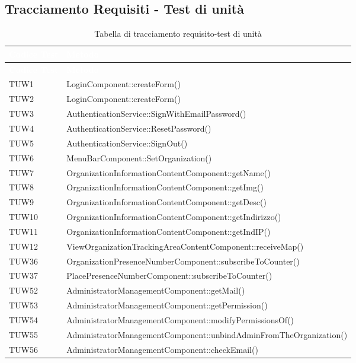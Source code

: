 \subsection{Tracciamento Requisiti - Test di unità}
{
\renewcommand{\arraystretch}{1.5}
\centering
\begin{longtable}{C{2cm} C{8cm}}
\caption{Tabella di tracciamento requisito-test di unità}\\
\textcolor{white}{\textbf{Codice Test}} & \textcolor{white}{\textbf{Metodo}}\\	
\endfirsthead
{}
\textcolor{white}{\textbf{Codice Test}} & \textcolor{white}{\textbf{Metodo}}\\	
\endhead

TUW1 & LoginComponent::createForm() \\
TUW2 & LoginComponent::createForm() \\
TUW3 & AuthenticationService::SignWithEmailPassword() \\
TUW4 & AuthenticationService::ResetPassword() \\
TUW5 & AuthenticationService::SignOut() \\
TUW6 & MenuBarComponent::SetOrganization() \\
TUW7 & OrganizationInformationContentComponent::getName() \\
TUW8 & OrganizationInformationContentComponent::getImg() \\
TUW9 & OrganizationInformationContentComponent::getDesc() \\
TUW10 & OrganizationInformationContentComponent::getIndirizzo() \\
TUW11 & OrganizationInformationContentComponent::getIndIP() \\
TUW12 & ViewOrganizationTrackingAreaContentComponent::receiveMap() \\
TUW36 & OrganizationPresenceNumberComponent::subscribeToCounter() \\
TUW37 & PlacePresenceNumberComponent::subscribeToCounter() \\
TUW52 & AdministratorManagementComponent::getMail()\\
TUW53 & AdministratorManagementComponent::getPermission()\\
TUW54 & AdministratorManagementComponent::modifyPermissionsOf()\\
TUW55 & AdministratorManagementComponent::unbindAdminFromTheOrganization()\\
TUW56 & AdministratorManagementComponent::checkEmail()\\

\end{longtable}}
